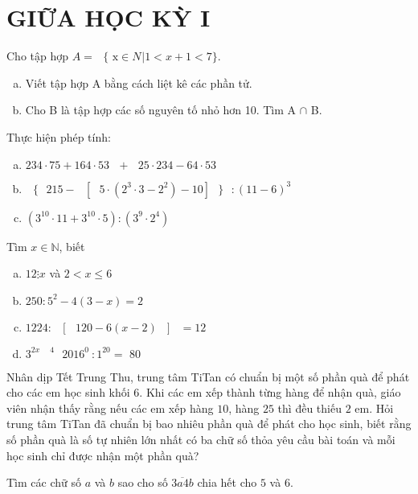 \section{GIỮA HỌC KỲ I}
\setcounter{ex}{0}
\begin{ex}
Cho tập hợp $A=\text{ }\!\!\{\!\!\text{ x}\in \left. {{N}^{{}}} \right|1<x+1<7\}$. 
	\begin{enumerate}[a)]
	\item Viết tập hợp A bằng cách liệt kê các phần tử.
\item Cho B là tập hợp các số nguyên tố nhỏ hơn 10. Tìm A $\cap $ B.
	\end{enumerate}
\end{ex}
\begin{ex}
	Thực hiện phép tính:
	\begin{enumerate}[a)]
\item $234\cdot 75+164\cdot 53\text{ }+\text{ }25\cdot 234-64\cdot 53$
\item $\text{ }\!\!\{\!\!\text{ }215-\text{ }\!\![\!\!\text{ }5\cdot ({{2}^{3}}\cdot 3-{{2}^{2}})-10]\text{ }\!\!\}\!\!\text{ }:{{(11-6)}^{3}}$
\item $({{3}^{10}}\cdot 11+{{3}^{10}}\cdot 5):({{3}^{9}}\cdot {{2}^{4}})$

	\end{enumerate}
\end{ex}
\begin{ex}
	Tìm $x \in \mathbb{N}$, biết
	\begin{enumerate}[a)]
\item $12\vdots x$ và $2<x\le 6$
\item $250:{{5}^{2}}-4(3-x)=2$
\item $1224:\text{ }\!\![\!\!\text{ }120-6(x-2)\text{ }\!\!]\!\!\text{ }=12$
\item ${{3}^{2x\text{ }\text{ }4}}\text{ }{{2016}^{0}}^{~}:{{1}^{20}}=\text{ 80}$ 
	\end{enumerate}
\end{ex}
\begin{ex}
	Nhân dịp Tết Trung Thu, trung tâm TiTan có chuẩn bị một số phần quà để phát cho các em học sinh khối $6$. Khi các em xếp thành từng hàng để nhận quà, giáo viên nhận thấy rằng nếu các em xếp hàng $10$, hàng $25$ thì đều thiếu $2$ em. Hỏi trung tâm TiTan đã chuẩn bị bao nhiêu phần quà để phát cho học sinh, biết rằng số phần quà là số tự nhiên lớn nhất có ba chữ số thỏa yêu cầu bài toán và mỗi học sinh chỉ được nhận một phần quà?
\end{ex}
\begin{ex}
Tìm các chữ số $a$ và $b$ sao cho số $\overline{3a4b}$ chia hết cho $5$ và $6$.
\end{ex}
